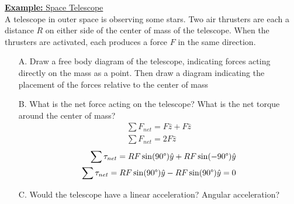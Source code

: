 \documentclass[a4paper]{article}
\let\bf\textbf
\begin{document}
\begin{shaded}
    \underline{\bf{Example:} Space Telescope}
    \vspace{2mm}\\
    A telescope in outer space is observing some stars. Two air thrusters are each a distance $R$ on either side of the center of mass of the telescope. When the thrusters are activated, each produces a force $F$ in the same direction.
    \begin{enumerate}
        \item[A.] Draw a free body diagram of the telescope, indicating forces acting directly on the mass as a point. Then draw a diagram indicating the placement of the forces relative to the center of mass
        \begin{center}
        \end{center}
        \item[B.] What is the net force acting on the telescope? What is the net torque around the center of mass?
        \begin{align*}
            \sum F_{net} = F\hat{z} + F\hat{z}\\
            \sum F_{net} = 2F\hat{z}
        \end{align*}
        \begin{align*}
            \sum\tau_{net} = RF\sin(90\degree)\hat{y} + RF\sin(-90\degree)\hat{y}\\
            \sum\tau_{net} = RF\sin(90\degree)\hat{y} - RF\sin(90\degree)\hat{y} = 0
        \end{align*}
        \item[C.] Would the telescope have a linear acceleration? Angular acceleration?
        \begin{center}
\end{center}
\end{enumerate}
\end{shaded}
\end{document}
